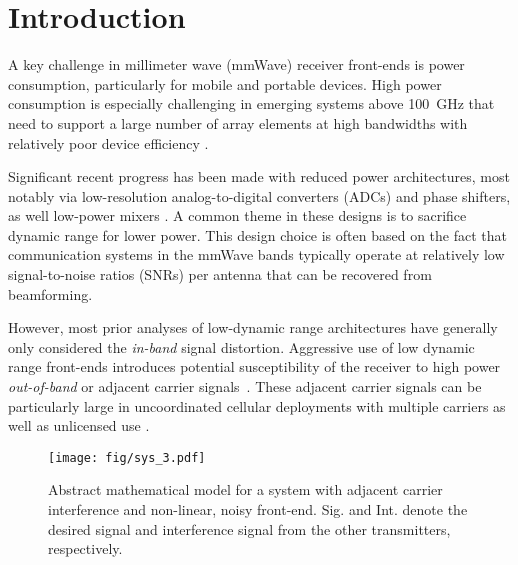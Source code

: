 \section{Introduction} \label{sec:intro}
A key challenge in millimeter wave (mmWave)
receiver front-ends is power consumption, particularly
for mobile and portable devices.
High power consumption is especially challenging
in emerging systems above \SI{100}{GHz} that need to support
a large number of array elements at high bandwidths
with relatively poor device efficiency \cite{mendez2015channel,rappaport2019wireless,skrimponis2020efficient,skrimponis2020power,yan2020dynamic,tan2020thz}.

Significant recent progress has been made with 
reduced power
architectures, most notably via low-resolution analog-to-digital converters (ADCs)
and phase shifters, as well low-power mixers \cite{naqvi2018review,abbas2017millimeter,zhang2018low,abdelghany2018towards,yan2019linearization,mo2017hybrid,jacobsson2017throughput}.  
A common theme in these designs
is to sacrifice dynamic range for lower power.
This design choice is often based on the fact that
communication systems in the mmWave bands typically operate
at relatively low signal-to-noise ratios (SNRs) per antenna
that can be recovered from beamforming.

However, most prior analyses of low-dynamic range
architectures have generally only considered the 
\emph{in-band} signal distortion.
Aggressive use of low dynamic range front-ends
introduces potential susceptibility of the receiver
to high power \emph{out-of-band} or 
adjacent carrier signals~\cite{marti2021hybrid,marti2021jammer,akhlaghpasand2020jamming}. 
These adjacent carrier signals can be particularly
large in uncoordinated 
cellular deployments with multiple carriers
as well as unlicensed use
\cite{rebato2017hybrid}.


 
\begin{figure}[t]
    \centering
    \texttt{[image: fig/sys\_3.pdf]}
    \caption{Abstract mathematical model for a system
    with adjacent carrier interference and non-linear,
    noisy front-end. Sig. and Int. denote the desired signal and interference signal from the other transmitters, respectively.}
    \label{fig:abstract_model}
\end{figure}


